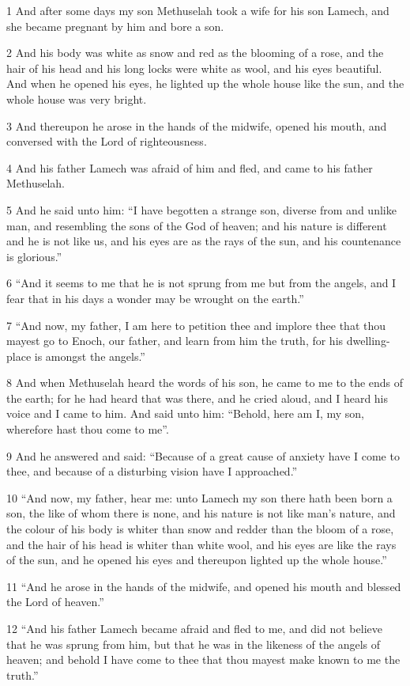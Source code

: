 \par 1 And after some days my son Methuselah took a wife for his son Lamech, and she became pregnant by him and bore a son.
\par 2 And his body was white as snow and red as the blooming of a rose, and the hair of his head and his long locks were white as wool, and his eyes beautiful. And when he opened his eyes, he lighted up the whole house like the sun, and the whole house was very bright.
\par 3 And thereupon he arose in the hands of the midwife, opened his mouth, and conversed with the Lord of righteousness.
\par 4 And his father Lamech was afraid of him and fled, and came to his father Methuselah.
\par 5 And he said unto him: “I have begotten a strange son, diverse from and unlike man, and resembling the sons of the God of heaven; and his nature is different and he is not like us, and his eyes are as the rays of the sun, and his countenance is glorious.”
\par 6 “And it seems to me that he is not sprung from me but from the angels, and I fear that in his days a wonder may be wrought on the earth.”
\par 7 “And now, my father, I am here to petition thee and implore thee that thou mayest go to Enoch, our father, and learn from him the truth, for his dwelling-place is amongst the angels.”
\par 8 And when Methuselah heard the words of his son, he came to me to the ends of the earth; for he had heard that was there, and he cried aloud, and I heard his voice and I came to him. And said unto him: “Behold, here am I, my son, wherefore hast thou come to me”.
\par 9 And he answered and said: “Because of a great cause of anxiety have I come to thee, and because of a disturbing vision have I approached.”
\par 10 “And now, my father, hear me: unto Lamech my son there hath been born a son, the like of whom there is none, and his nature is not like man's nature, and the colour of his body is whiter than snow and redder than the bloom of a rose, and the hair of his head is whiter than white wool, and his eyes are like the rays of the sun, and he opened his eyes and thereupon lighted up the whole house.”
\par 11 “And he arose in the hands of the midwife, and opened his mouth and blessed the Lord of heaven.”
\par 12 “And his father Lamech became afraid and fled to me, and did not believe that he was sprung from him, but that he was in the likeness of the angels of heaven; and behold I have come to thee that thou mayest make known to me the truth.”
